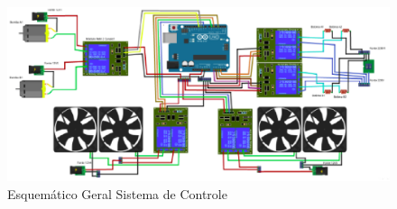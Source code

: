 \begin{figure}[hb]                  
    \centering                          
    \includegraphics[scale=0.6]{figuras/siscontrole.eps}
    \caption{ Esquemático Geral Sistema de Controle }   \label{figsiscontrole}              
\end{figure}
\newpage
